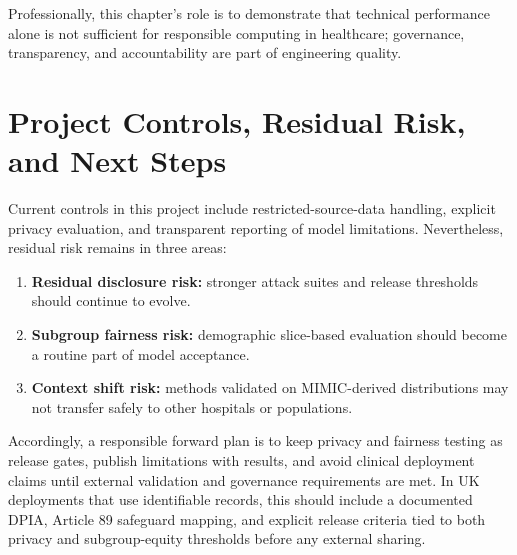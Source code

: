 Professionally, this chapter's role is to demonstrate that technical performance alone is not sufficient for responsible computing in healthcare; governance, transparency, and accountability are part of engineering quality.

\section{Project Controls, Residual Risk, and Next Steps}

Current controls in this project include restricted-source-data handling, explicit privacy evaluation, and transparent reporting of model limitations. Nevertheless, residual risk remains in three areas:
\begin{enumerate}\tightlist
    \item \textbf{Residual disclosure risk:} stronger attack suites and release thresholds should continue to evolve.
    \item \textbf{Subgroup fairness risk:} demographic slice-based evaluation should become a routine part of model acceptance.
    \item \textbf{Context shift risk:} methods validated on MIMIC-derived distributions may not transfer safely to other hospitals or populations.
\end{enumerate}

Accordingly, a responsible forward plan is to keep privacy and fairness testing as release gates, publish limitations with results, and avoid clinical deployment claims until external validation and governance requirements are met. In UK deployments that use identifiable records, this should include a documented DPIA, Article 89 safeguard mapping, and explicit release criteria tied to both privacy and subgroup-equity thresholds before any external sharing.
